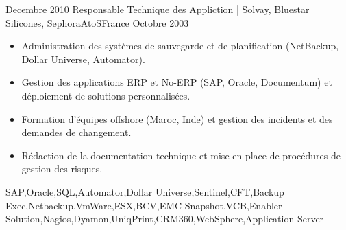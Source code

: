 \begin{experiences}
  \emptySeparator         
  \experience
  {Decembre 2010}  {Responsable Technique des Appliction | Solvay, Bluestar Silicones, Sephora}{AtoS}{France}
  {Octobre 2003}   {
                      \begin{itemize}
                        \item Administration des systèmes de sauvegarde et de planification (NetBackup, Dollar Universe, Automator).                                            
                        \item Gestion des applications ERP et No-ERP (SAP, Oracle, Documentum) et déploiement de solutions personnalisées.
                        \item Formation d'équipes offshore (Maroc, Inde) et gestion des incidents et des demandes de changement.
                        \item Rédaction de la documentation technique et mise en place de procédures de gestion des risques.
                      \end{itemize}
                  }
                  {SAP,Oracle,SQL,Automator,Dollar Universe,Sentinel,CFT,Backup Exec,Netbackup,VmWare,ESX,BCV,EMC Snapshot,VCB,Enabler Solution,Nagios,Dyamon,UniqPrint,CRM360,WebSphere,Application Server}
\end{experiences}

